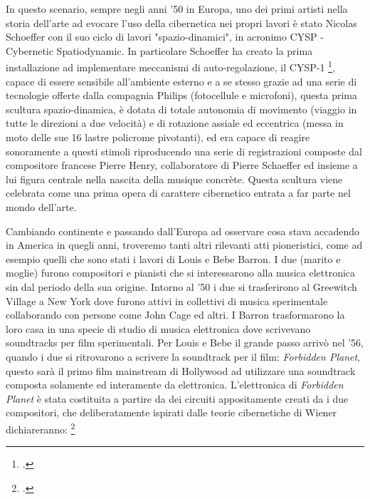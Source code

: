 In questo scenario, sempre negli anni '50 in Europa, uno dei primi artisti nella storia dell'arte
ad evocare l'uso della cibernetica nei propri lavori è stato
Nicolas Schoeffer con il suo ciclo di lavori "spazio-dinamici", in acronimo
CYSP - Cybernetic Spatiodynamic.
In particolare Schoeffer ha creato la prima installazione ad implementare meccanismi
di auto-regolazione, il CYSP-1 \footcite{sanfilippovallefeedsys},
capace di essere sensibile all'ambiente esterno e a se stesso
grazie ad una serie di tecnologie offerte dalla compagnia Philips (fotocellule e microfoni),
questa prima scultura spazio-dinamica, è dotata di totale autonomia di movimento
(viaggio in tutte le direzioni a due velocità) e di rotazione assiale ed eccentrica
(messa in moto delle sue 16 lastre policrome pivotanti),
ed era capace di reagire sonoramente a questi stimoli riproducendo
una serie di registrazioni composte dal compositore francese Pierre Henry,
collaboratore di Pierre Schaeffer ed insieme a lui figura centrale nella nascita della musique concrète.
Questa scultura viene celebrata come una prima opera di carattere cibernetico 
entrata a far parte nel mondo dell'arte.

Cambiando continente e passando dall'Europa ad osservare cosa stava accadendo
in America in quegli anni, troveremo tanti altri rilevanti atti pioneristici,
come ad esempio quelli che sono stati i lavori di Louis e Bebe Barron.
I due (marito e moglie) furono compositori e pianisti che si
interessarono alla musica elettronica sin dal periodo della sua origine.
Intorno al '50 i due si trasferirono al Greewitch Village a New York
dove furono attivi in collettivi di musica sperimentale
collaborando con persone come John Cage ed altri.
I Barron trasformarono
la loro casa in una specie di studio di musica elettronica
dove scrivevano soundtracks per film sperimentali.
Per Louis e Bebe il grande passo arrivò nel
'56, quando i due si ritrovarono a scrivere la soundtrack per il film:
\textit{Forbidden Planet},
questo sarà il primo film mainstream di Hollywood ad utilizzare una soundtrack
composta solamente ed interamente da elettronica.
L'elettronica di \textit{Forbidden Planet} è stata
costituita a partire da dei circuiti appositamente creati da i due compositori,
che deliberatamente ispirati dalle teorie cibernetiche di Wiener
dichiareranno: \footcite{dunbarlisteningcyb}


